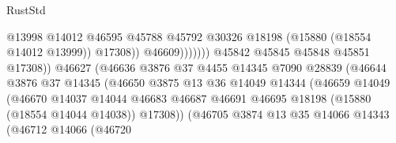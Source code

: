 \begin{lexlean}{RustStd}
\begin{coremodule}
                                                      @13998
                                                      @14012
                                                      @46595
                                                      @45788
                                                      @45792
                                                      @30326
                                                      @18198
                                                      (@15880 (@18554 @14012 @13999))
                                                      @17308))
                                                  @46609)))))))
                                    @45842
                                    @45845
                                    @45848
                                    @45851
                                    @17308))
                                @46627
                                (@46636
                                  @3876
                                  @37
                                  @4455
                                  @14345
                                  @7090
                                  @28839
                                  (@46644
                                    @3876
                                    @37
                                    @14345
                                    (@46650
                                      @3875
                                      @13
                                      @36
                                      @14049
                                      @14344
                                      (@46659
                                        @14049
                                        (@46670
                                          @14037
                                          @14044
                                          @46683
                                          @46687
                                          @46691
                                          @46695
                                          @18198
                                          (@15880 (@18554 @14044 @14038))
                                          @17308))
                                      (@46705
                                        @3874
                                        @13
                                        @35
                                        @14066
                                        @14343
                                        (@46712
                                          @14066
                                          (@46720

\end{coremodule}
\end{lexlean}

